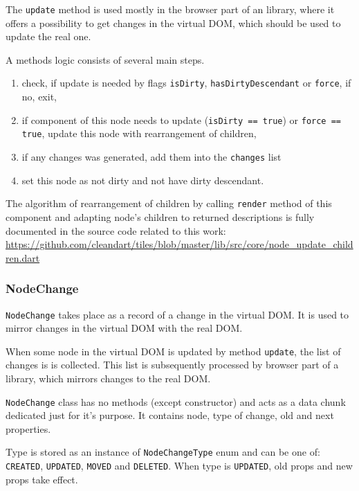 \documentclass[oneside, 12pt]{book}
\begin{document}
			The \texttt{update} method is used mostly in the browser part of an library, where it offers a possibility to get changes in the virtual DOM, which should be used to update the real one. 

      A methods logic consists of several main steps.
      \begin{enumerate}
				\item check, if update is needed by flags \texttt{isDirty}, \texttt{hasDirtyDescendant} or \texttt{force}, if no, exit,
				\item if component of this node needs to update (\texttt{isDirty == true}) or \texttt{force == true}, update this node with rearrangement of children,
				\item if any changes was generated, add them into the \texttt{changes} list
        \item set this node as not dirty and not have dirty descendant.
      \end{enumerate}

      The algorithm of rearrangement of children by calling \texttt{render} method of this component 
      and adapting node's children to returned descriptions is fully documented in the source code related to this work: 
      \url{https://github.com/cleandart/tiles/blob/master/lib/src/core/node_update_children.dart}

    \subsubsection{NodeChange}\label{subsubsec:our-architecture-core-node-change}
      \texttt{NodeChange} takes place as a record of a change in the virtual DOM. 
      It is used to mirror changes in the virtual DOM with the real DOM. 

			When some node in the virtual DOM is updated by method \texttt{update}, the list of changes is is collected.
      This list is subsequently processed by browser part of a library, which mirrors changes to the real DOM.

      \texttt{NodeChange} class has no methods (except constructor) and acts as a data chunk dedicated just for it's purpose. 
      It contains node, type of change, old and next properties. 

      Type is stored as an instance of \texttt{NodeChangeType} enum and can be one of: \texttt{CREATED}, \texttt{UPDATED}, 
      \texttt{MOVED} and \texttt{DELETED}. 
      When type is \texttt{UPDATED}, old props and new props take effect. 
\end{document}
